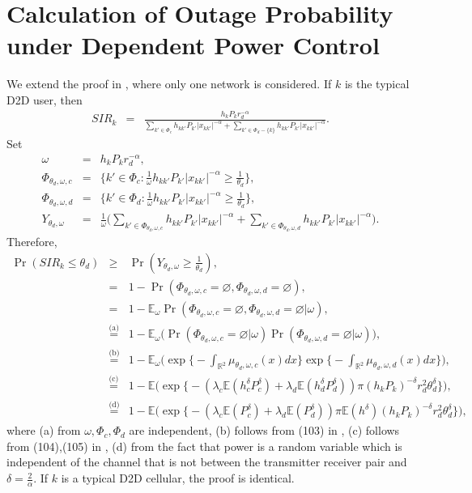 \documentclass[12pt, draftclsnofoot, journal, letterpaper, onecolumn]{IEEEtran}
\begin{document}
\section{Calculation of Outage Probability under Dependent Power Control}\label{COPDPC}
\begin{IEEEproof}
We extend the proof in \cite{OP}, where only one network is considered.
If $k$ is the typical D2D user,
then
\begin{eqnarray*}
SIR_k&=&\frac{h_kP_kr_d^{-\alpha}}{\sum_{k'\in\Phi_c}h_{kk'}P_{k'}|x_{kk'}|^{-\alpha}+\sum_{k'\in\Phi_d-\{k\}}h_{kk'}P_{k'}|x_{kk'}|^{-\alpha}}.
\end{eqnarray*}
Set
\begin{eqnarray*}
\omega&=&h_kP_kr_d^{-\alpha},\\
\Phi_{\theta_d,\omega,c}&=&\big\{k'\in\Phi_c:\frac{1}{\omega}h_{kk'}P_{k'}|x_{kk'}|^{-\alpha}\geq\frac{1}{\theta_d}\big\},\\
\Phi_{\theta_d,\omega,d}&=&\big\{k'\in\Phi_d:\frac{1}{\omega}h_{kk'}P_{k'}|x_{kk'}|^{-\alpha}\geq\frac{1}{\theta_d}\big\},\\
Y_{\theta_d,\omega}&=&\frac{1}{\omega}\bigg(\sum_{k'\in\Phi_{\theta_d,\omega,c}}h_{kk'}P_{k'}|x_{kk'}|^{-\alpha}+\sum_{k'\in\Phi_{\theta_d,\omega,d}}h_{kk'}P_{k'}|x_{kk'}|^{-\alpha}\bigg).
\end{eqnarray*}
Therefore,
\begin{eqnarray*}
\Pr(SIR_k\leq\theta_d)&\geq&\Pr(Y_{\theta_d,\omega}\geq\frac{1}{\theta_d}),\\
&=&1-\Pr(\Phi_{\theta_d,\omega,c}=\varnothing,\Phi_{\theta_d,\omega,d}=\varnothing),\\
& {=} & 1-\mathbb{E}_{\omega}\Pr(\Phi_{\theta_d,\omega,c}=\varnothing,\Phi_{\theta_d,\omega,d}=\varnothing|\omega),\\
& \overset{\text{(a)}}{=} & 1-\mathbb{E}_{\omega}\big(\Pr(\Phi_{\theta_d,\omega,c}=\varnothing|\omega)\Pr(\Phi_{\theta_d,\omega,d}=\varnothing|\omega)\big),\\
& \overset{\text{(b)}}{=} & 1-\mathbb{E}_{\omega}\big(\exp\big\{-\int_{\mathbb{R}^2}\mu_{\theta_d,\omega,c}(x)dx\big\}\exp\big\{-\int_{\mathbb{R}^2}\mu_{\theta_d,\omega,d}(x)dx\big\}\big),\\
& \overset{\text{(c)}}{=} &
1-\mathbb{E}\big(\exp\big\{-(\lambda_c\mathbb{E}(h_c^\delta P_c^\delta)+\lambda_d\mathbb{E}(h_d^\delta P_d^\delta))\pi(h_kP_k)^{-\delta}r_d^2\theta_d^\delta\big\}\big),\\
& \overset{\text{(d)}}{=} &
1-\mathbb{E}\big(\exp\big\{-(\lambda_c\mathbb{E}(P_c^\delta)+\lambda_d\mathbb{E}(P_d^\delta))\pi\mathbb{E}(h^\delta)(h_kP_k)^{-\delta}r_d^2\theta_d^\delta\big\}\big),
\end{eqnarray*}
where (a) from $\omega,\Phi_c,\Phi_d$ are independent, (b) follows from (103) in \cite{OP}, (c) follows from (104),(105) in \cite{OP}, (d) from the fact that power is a random variable which is independent of the channel that is not between the transmitter receiver pair and $\delta=\frac{2}{\alpha}$. If $k$ is a typical D2D cellular, the proof is identical.
\end{IEEEproof}
\end{document}
